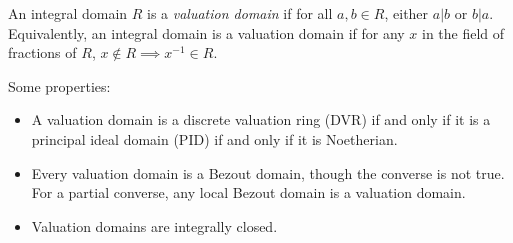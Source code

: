 \documentclass[12pt]{article}
\newcommand{\<}{\langle}
\renewcommand{\>}{\rangle}
\begin{document}
An integral domain $R$ is a \emph{valuation domain} if for all $a,b\in R$, either $a|b$ or $b|a$.  Equivalently, an integral domain is a valuation domain if for any $x$ in the field of fractions of $R$, $x\notin R\implies x^{-1}\in R$.

Some properties:
\begin{itemize}
\item A valuation domain is a discrete valuation ring (DVR) if and only if it is a principal ideal domain (PID) if and only if it is Noetherian.
\item Every valuation domain is a Bezout domain, though the converse is not true.  For a partial converse, any local Bezout domain is a valuation domain.
\item Valuation domains are integrally closed.
\end{itemize}
\end{document}
